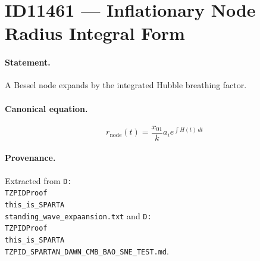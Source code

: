 \section*{ID11461 --- Inflationary Node Radius Integral Form}

\paragraph{Statement.}
A Bessel node expands by the integrated Hubble breathing factor.

\paragraph{Canonical equation.}
\[
r_{\mathrm{node}}(t)=\frac{x_{01}}{k}a_i e^{\int H(t)\,dt}
\]

\paragraph{Provenance.}
Extracted from \texttt{D:\\TZPIDProof\\this\_is\_SPARTA\\standing\_wave\_expaansion.txt} and \texttt{D:\\TZPIDProof\\this\_is\_SPARTA\\TZPID\_SPARTAN\_DAWN\_CMB\_BAO\_SNE\_TEST.md}.

